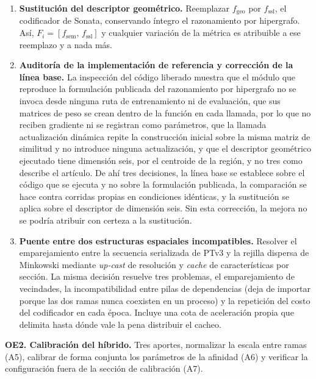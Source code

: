 \begin{enumerate}
\item[\textbf{A1}] \textbf{Sustitución del descriptor geométrico.} Reemplazar
$f_{\text{geo}}$ por $f_{\mathrm{ssl}}$, el codificador de Sonata,
conservando íntegro el razonamiento por hipergrafo. Así,
$F_i = [f_{\mathrm{sem}},\, f_{\mathrm{ssl}}]$ y cualquier variación de
la métrica es atribuible a ese reemplazo y a nada más.

\item[\textbf{A2}] \textbf{Auditoría de la implementación de referencia y
corrección de la línea base.} La inspección del código liberado muestra
que el módulo que reproduce la formulación publicada del razonamiento por
hipergrafo no se invoca desde ninguna ruta de entrenamiento ni de evaluación, que
sus matrices de peso se crean dentro de la función en cada llamada, por lo que no
reciben gradiente ni se registran como parámetros, que la llamada actualización
dinámica repite la construcción inicial sobre la misma matriz de similitud y no
introduce ninguna actualización, y que el descriptor geométrico ejecutado tiene
dimensión seis, por el centroide de la región, y no tres como describe el
artículo. De ahí tres decisiones, la línea base se establece sobre el código que
se ejecuta y no sobre la formulación publicada, la comparación se hace contra
corridas propias en condiciones idénticas, y la sustitución se aplica sobre el
descriptor de dimensión seis. Sin esta corrección, la mejora no se podría atribuir
con certeza a la sustitución.

\item[\textbf{A4}] \textbf{Puente entre dos estructuras espaciales
incompatibles.} Resolver el emparejamiento entre la secuencia serializada de PTv3
y la rejilla dispersa de Minkowski mediante \emph{up-cast} de resolución y
\emph{cache} de características por sección. La misma decisión resuelve tres
problemas, el emparejamiento de vecindades, la incompatibilidad entre pilas de
dependencias (deja de importar porque las dos ramas nunca coexisten en un
proceso) y la repetición del costo del codificador en cada época. Incluye una cota
de aceleración propia que delimita hasta dónde vale la pena distribuir el
cacheo.
\end{enumerate}

\medskip
\noindent\textbf{OE2. Calibración del híbrido.} Tres aportes, normalizar la
escala entre ramas (A5), calibrar de forma conjunta los parámetros de la afinidad
(A6) y verificar la configuración fuera de la sección de calibración (A7).

